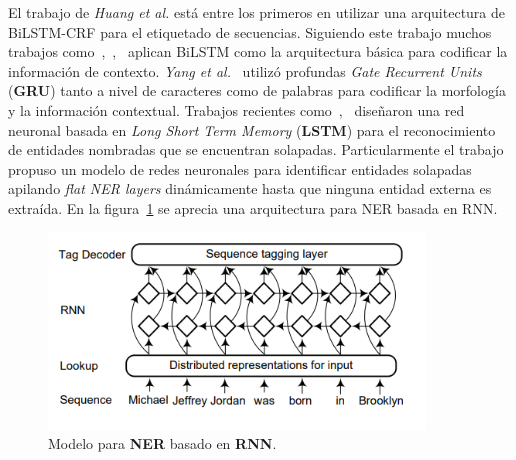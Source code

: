 El trabajo de \emph{Huang et al.}\cite{huang2015bidirectional} est\'a entre los primeros en utilizar una arquitectura de BiLSTM-CRF para el etiquetado de secuencias. Siguiendo este trabajo muchos trabajos como~\cite{chiu2016named},~\cite{ma2016end},~\cite{wei2016disease} aplican BiLSTM como la arquitectura b\'asica para codificar la informaci\'on de contexto. \emph{Yang et al.}~\cite{yang2016multi} utiliz\'o profundas \emph{Gate Recurrent Units} (\textbf{GRU}) tanto a nivel de caracteres como de palabras para codificar la morfolog\'ia y la informaci\'on contextual. Trabajos recientes como~\cite{katiyar2018nested},~\cite{ju2018neural} dise\~naron una red neuronal basada en \emph{Long Short Term Memory} (\textbf{LSTM}) para el reconocimiento de entidades nombradas que se encuentran solapadas. Particularmente el trabajo~\cite{ju2018neural} propuso un modelo de redes neuronales para identificar entidades solapadas apilando \emph{flat NER layers} din\'amicamente hasta que ninguna entidad externa es extra\'ida. En la figura~\ref{fig:RNN} se aprecia una arquitectura para NER basada en RNN.

\begin{figure}[h!]
	\centering
	\includegraphics[width = 10cm]{Graphics/RNN_Arquitecture.png}
	\caption{Modelo para \textbf{NER} basado en \textbf{RNN}.}\label{fig:RNN}
\end{figure}

%

